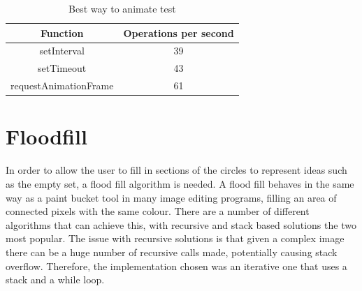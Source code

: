 \documentclass[12pt,a4paper]{report}
\begin{document}
\begin{table}[ht]
\centering
\begin{adjustbox}{width=1\textwidth}
\small
\begin{tabular}{ c | c }
  \hline
 Function & Operations per second \\ \hline 
    setInterval & 39 \\
    setTimeout & 43 \\
    requestAnimationFrame & 61 \\
   \hline
\end{tabular}
\end{adjustbox}
\caption{Best way to animate test} 
\end{table} 

\section{Floodfill}
In order to allow the user to fill in sections of the circles to represent ideas such as the empty set, a flood fill algorithm is needed. A flood fill behaves in the same way as a paint bucket tool in many image editing programs, filling an area of connected pixels with the same colour. There are a number of different algorithms that can achieve this, with recursive and stack based solutions the two most popular. The issue with recursive solutions is that given a complex image there can be a huge number of recursive calls made, potentially causing stack overflow. 
Therefore, the implementation chosen was an iterative one that uses a stack and a while loop.
\end{document}
